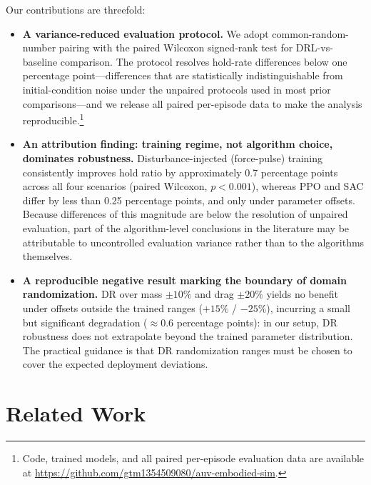 \documentclass[conference]{IEEEtran}
\begin{document}
Our contributions are threefold:
\begin{itemize}
\item \textbf{A variance-reduced evaluation protocol.} We adopt common-random-number pairing with the paired Wilcoxon signed-rank test for DRL-vs-baseline comparison. The protocol resolves hold-rate differences below one percentage point---differences that are statistically indistinguishable from initial-condition noise under the unpaired protocols used in most prior comparisons---and we release all paired per-episode data to make the analysis reproducible.\footnote{Code, trained models, and all paired per-episode evaluation data are available at \url{https://github.com/gtm1354509080/auv-embodied-sim}.}
\item \textbf{An attribution finding: training regime, not algorithm choice, dominates robustness.} Disturbance-injected (force-pulse) training consistently improves hold ratio by approximately 0.7 percentage points across all four scenarios (paired Wilcoxon, $p<0.001$), whereas PPO and SAC differ by less than 0.25 percentage points, and only under parameter offsets. Because differences of this magnitude are below the resolution of unpaired evaluation, part of the algorithm-level conclusions in the literature may be attributable to uncontrolled evaluation variance rather than to the algorithms themselves.
\item \textbf{A reproducible negative result marking the boundary of domain randomization.} DR over mass $\pm10\%$ and drag $\pm20\%$ yields no benefit under offsets outside the trained ranges ($+15\%$ / $-25\%$), incurring a small but significant degradation ($\approx 0.6$ percentage points): in our setup, DR robustness does not extrapolate beyond the trained parameter distribution. The practical guidance is that DR randomization ranges must be chosen to cover the expected deployment deviations.
\end{itemize}

\section{Related Work}
\end{document}
